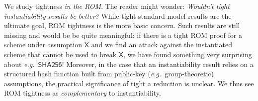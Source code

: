 We study tightness \emph{in the ROM}. The reader might wonder: \emph{Wouldn’t tight instantiability results be better?} While tight standard-model results are the ultimate goal,  ROM tightness  is the more basic concern. Such results are still missing and would be be quite meaningful: if there is a  tight ROM  proof for a scheme under assumption $\mathsf{X}$ and we find an attack against the instantiated  scheme   that cannot be used to break $\mathsf{X}$, we have found something very surprising about  \emph{e.g.}~$\mathsf{SHA256}$! Moreover, in the case that an instantiability result  relies on a structured hash function built from public-key (\emph{e.g.}~group-theoretic)  assumptions,  the practical significance of tight a reduction  is   unclear. We thus see ROM tightness as \emph{complementary} to  instantiability.
 


